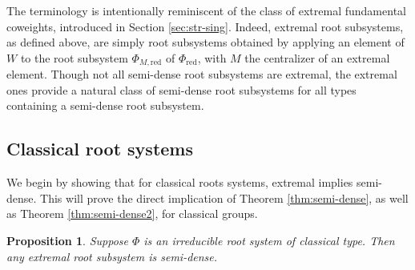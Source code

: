 \documentclass[12pt]{amsart}
\newtheorem{proposition}[theorem]{Proposition}
\theoremstyle{remark}
\begin{document}
The terminology is intentionally reminiscent of the class of extremal fundamental coweights, introduced in Section \ref{sec:str-sing}. Indeed, extremal root subsystems, as defined above, are simply root subsystems obtained by applying an element of $W$ to the root subsystem $\Phi_{M, \textrm{red}}$ of $\Phi_{\textrm{red}}$, with $M$ the centralizer of an extremal element. Though not all semi-dense root subsystems are extremal, the extremal ones provide a natural class of semi-dense root subsystems for all types containing a semi-dense root subsystem.





\subsection{Classical root systems}\label{sec:big-root}

We begin by showing that for classical roots systems, extremal implies semi-dense. This will prove the direct implication of Theorem \ref{thm:semi-dense}, as well as Theorem \ref{thm:semi-dense2}, for classical groups.
\begin{proposition}
\label{Sibd}
    Suppose $\Phi$ is an irreducible root system of classical type. Then any extremal root subsystem is semi-dense. 
\end{proposition}
\end{document}
